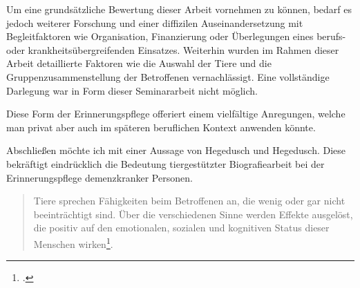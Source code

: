Um eine grundsätzliche Bewertung dieser Arbeit vornehmen zu können, bedarf es jedoch weiterer Forschung und einer diffizilen Auseinandersetzung mit Begleitfaktoren wie Organisation, Finanzierung oder Überlegungen eines berufs- oder krankheitsübergreifenden Einsatzes. Weiterhin wurden im Rahmen dieser Arbeit detaillierte Faktoren wie die Auswahl der Tiere und die Gruppenzusammenstellung der Betroffenen vernachlässigt. Eine vollständige Darlegung war in Form dieser Seminararbeit nicht möglich. 

Diese Form der Erinnerungspflege offeriert einem vielfältige Anregungen, welche man privat aber auch im späteren beruflichen Kontext anwenden könnte.

Abschließen möchte ich mit einer Aussage von Hegedusch und Hegedusch. Diese bekräftigt eindrücklich die Bedeutung tiergestützter Biografiearbeit bei der Erinnerungspflege demenzkranker Personen.

\begin{quotation}
Tiere sprechen Fähigkeiten beim Betroffenen an, die wenig oder gar nicht beeinträchtigt sind. Über die verschiedenen Sinne werden Effekte ausgelöst, die positiv auf den emotionalen, sozialen und kognitiven Status dieser Menschen wirken\footcite[72]{Hegedusch2007}.
\end{quotation}